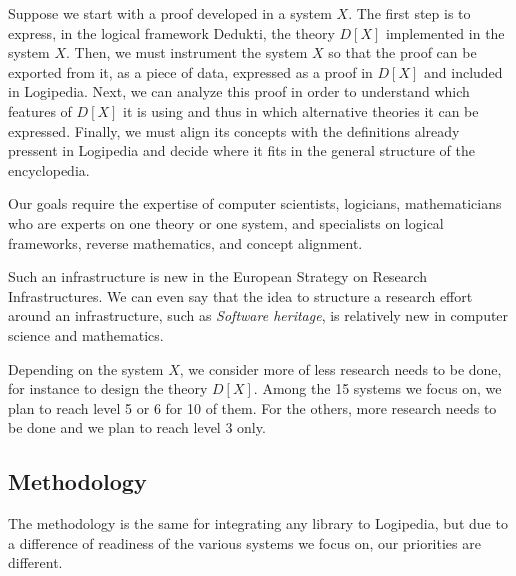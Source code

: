 Suppose we start with a proof developed in a system $X$. The first step
is to express, in the logical framework {\sc Dedukti}, the theory
$D[X]$ implemented in the system $X$. Then, we must instrument the
system $X$ so that the proof can be exported from it, as a piece of
data, expressed as a proof in $D[X]$ and included in {\sc
Logipedia}. Next, we can analyze this proof in order to understand
which features of $D[X]$ it is using and thus in which alternative
theories it can be expressed.  Finally, we must align its concepts with
the definitions already pressent in {\sc Logipedia} and decide where
it fits in the general structure of the encyclopedia.

Our goals require the expertise of computer scientists,
logicians, mathematicians who are experts on one
theory or one system, and specialists on logical
frameworks, reverse mathematics, and concept alignment.

Such an infrastructure is new in the European Strategy on Research
Infrastructures. We can even say that the idea to structure a research
effort around an infrastructure, such as {\em Software heritage}, is
relatively new in computer science and mathematics.

Depending on the system $X$, we consider more of less research needs
to be done, for instance to design the theory $D[X]$. Among the 15
systems we focus on, we plan to reach level 5 or 6 for 10 of them.
For the others, more research needs to be done and we plan to reach
level 3 only.

\subsection{Methodology}

The methodology is the same for integrating any library to {\sc Logipedia},
but due to a difference of readiness of the various systems we focus on,
our priorities are different.

